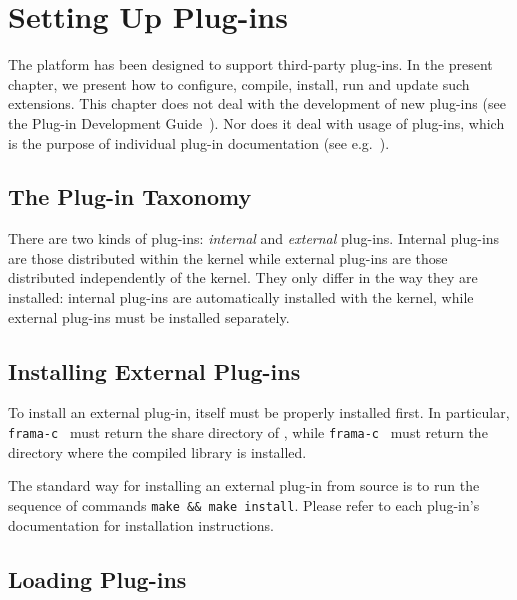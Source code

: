 \chapter{Setting Up Plug-ins}
\label{user-plugins}

The \FramaC platform has been designed to support third-party plug-ins. In the
present chapter, we present how to configure, compile, install, run and update
such extensions. This chapter does not deal with the development of new plug-ins (see the \textsf{Plug-in Development
  Guide}~\cite{plugin-dev-guide}). Nor does it deal with usage
of plug-ins, which is the purpose of individual plug-in documentation (see e.g.~\cite{value,wp,slicing}).

\section{The Plug-in Taxonomy}\label{sec:plugin-taxonomy}

There are two kinds of plug-ins: \emph{internal} and \emph{external} plug-ins.
Internal plug-ins are those distributed within the \FramaC kernel while
external plug-ins are those distributed independently of the \FramaC
kernel. They only differ in the way they are installed:
internal plug-ins are automatically installed with the \FramaC kernel,
while external plug-ins must be installed separately.

\section{Installing External Plug-ins}\label{sec:install-external}

To install an external plug-in, \FramaC itself must be properly installed
first. In particular, \texttt{frama-c }
must return the share directory of \FramaC,
while \texttt{frama-c }
must return the directory where the \FramaC compiled library is installed.

The standard way for installing an external plug-in from source is to run the
sequence of commands \texttt{make \&\& make install}. Please refer to each
plug-in's documentation for installation instructions.

\section{Loading Plug-ins}\label{sec:use-plugins}


